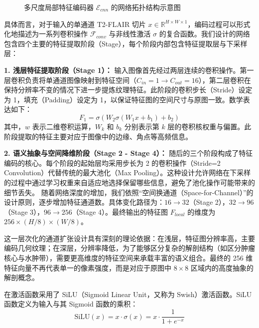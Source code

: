 \documentclass[Win]{xjtuBSThesis}  %
\begin{document}
\begin{figure}[htbp]
    \centering
    \caption{多尺度局部特征编码器 $\mathcal{E}_{cnn}$ 的网络拓扑结构示意图}
    \label{fig:cnn_structure}
\end{figure}

具体而言，对于输入的单通道 T2-FLAIR 切片 $x \in \mathbb{R}^{H \times W \times 1}$，编码过程可以形式化地描述为一系列卷积操作 $\mathcal{F}_{conv}$ 与非线性激活 $\sigma$ 的复合函数。我们设计的网络包含四个主要的特征提取阶段（Stage），每个阶段内部包含特征提取层与下采样层：

\textbf{1. 浅层特征提取阶段（Stage 1）：}
输入图像首先经过两层连续的卷积操作。第一层卷积负责将单通道图像映射到特征空间（$C_{in}=1 \to C_{out}=16$），第二层卷积在保持分辨率不变的情况下进一步提炼纹理特征。此阶段的卷积步长（Stride）设定为 1，填充（Padding）设定为 1，以保证特征图的空间尺寸与原图一致。数学表达如下：
\begin{equation}
    F_1 = \sigma(W_2  \sigma(W_1  x + b_1) + b_2)
\end{equation}
其中，$w$ 表示二维卷积运算，$W_k$ 和 $b_k$ 分别表示第 $k$ 层的卷积核权重与偏置。此阶段提取的特征主要对应于图像中的边缘、角点等高频信息。

\textbf{2. 语义抽象与空间降维阶段（Stage 2 - Stage 4）：}
随后的三个阶段构成了特征编码的核心。每个阶段的起始层均采用步长为 2 的卷积操作（Stride=2 Convolution）代替传统的最大池化（Max Pooling）。这种设计允许网络在下采样的过程中通过学习权重来自适应地选择保留哪些信息，避免了池化操作可能带来的细节丢失。
随着网络深度的增加，我们依照“空间换通道（Space-for-Channel）”的设计原则，逐步增加特征通道数。具体变化路径为：$16 \to 32$（Stage 2），$32 \to 96$（Stage 3），$96 \to 256$（Stage 4）。最终输出的特征图 $F_{local}$ 的维度为 $256 \times (H/8) \times (W/8)$。

这一层次化的通道扩张设计具有深刻的理论依据：在浅层，特征图分辨率高，主要编码几何纹理；在深层，分辨率降低，为了能够区分复杂的解剖结构（如区分肿瘤核心与水肿带），需要更高维度的特征空间来承载丰富的语义组合。最终的 256 维特征向量不再代表单一的像素强度，而是对应于原图中 $8 \times 8$ 区域内的高度抽象的解剖概念。


在激活函数采用了 SiLU（Sigmoid Linear Unit，又称为 Swish）激活函数。SiLU 函数定义为输入与其 Sigmoid 函数的乘积：
\begin{equation}
    \text{SiLU}(x) = x \cdot \sigma(x) = x \cdot \frac{1}{1 + e^{-x}}
\end{equation}
\end{document}
